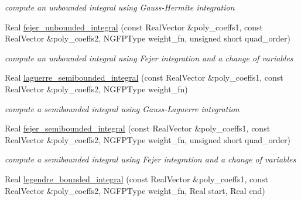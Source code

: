 \begin{DoxyCompactItemize}
\begin{DoxyCompactList}\small\item\em compute an unbounded integral using Gauss-\/\+Hermite integration \end{DoxyCompactList}\item 
Real \hyperlink{classPecos_1_1NumericGenOrthogPolynomial_a721564810dcb06e9312fb31460c2ee21}{fejer\+\_\+unbounded\+\_\+integral} (const Real\+Vector \&poly\+\_\+coeffs1, const Real\+Vector \&poly\+\_\+coeffs2, N\+G\+F\+P\+Type weight\+\_\+fn, unsigned short quad\+\_\+order)\label{classPecos_1_1NumericGenOrthogPolynomial_a721564810dcb06e9312fb31460c2ee21}

\begin{DoxyCompactList}\small\item\em compute an unbounded integral using Fejer integration and a change of variables \end{DoxyCompactList}\item 
Real \hyperlink{classPecos_1_1NumericGenOrthogPolynomial_ae17c3dfbaf740f88bc54e871d100e31b}{laguerre\+\_\+semibounded\+\_\+integral} (const Real\+Vector \&poly\+\_\+coeffs1, const Real\+Vector \&poly\+\_\+coeffs2, N\+G\+F\+P\+Type weight\+\_\+fn)\label{classPecos_1_1NumericGenOrthogPolynomial_ae17c3dfbaf740f88bc54e871d100e31b}

\begin{DoxyCompactList}\small\item\em compute a semibounded integral using Gauss-\/\+Laguerre integration \end{DoxyCompactList}\item 
Real \hyperlink{classPecos_1_1NumericGenOrthogPolynomial_a727a5700d623d38660a42878f1c2aa5e}{fejer\+\_\+semibounded\+\_\+integral} (const Real\+Vector \&poly\+\_\+coeffs1, const Real\+Vector \&poly\+\_\+coeffs2, N\+G\+F\+P\+Type weight\+\_\+fn, unsigned short quad\+\_\+order)\label{classPecos_1_1NumericGenOrthogPolynomial_a727a5700d623d38660a42878f1c2aa5e}

\begin{DoxyCompactList}\small\item\em compute a semibounded integral using Fejer integration and a change of variables \end{DoxyCompactList}\item 
Real \hyperlink{classPecos_1_1NumericGenOrthogPolynomial_af77a17f10ee8f8567e5be5bc77ec4e55}{legendre\+\_\+bounded\+\_\+integral} (const Real\+Vector \&poly\+\_\+coeffs1, const Real\+Vector \&poly\+\_\+coeffs2, N\+G\+F\+P\+Type weight\+\_\+fn, Real start, Real end)\label{classPecos_1_1NumericGenOrthogPolynomial_af77a17f10ee8f8567e5be5bc77ec4e55}


\end{DoxyCompactItemize}

